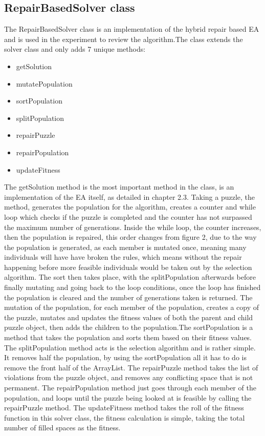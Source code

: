 \documentclass[a4paper,11pt]{article}
\begin{document}
\subsection{RepairBasedSolver class}

The RepairBasedSolver class is an implementation of the hybrid repair based EA and is used in the experiment to review the algorithm.\newline\newline The class extends the solver class and only adds 7 unique methods:
\begin{itemize}
	\item getSolution
	\item mutatePopulation
	\item sortPopulation
	\item splitPopulation
	\item repairPuzzle
	\item repairPopulation
	\item updateFitness
\end{itemize}
The getSolution method is the most important method in the class, is an implementation of the EA itself, as detailed in chapter 2.3. Taking a puzzle, the method, generates the population for the algorithm, creates a counter and while loop which checks if the puzzle is completed and the counter has not surpassed the maximum number of generations. Inside the while loop, the counter increases, then the population is repaired, this order changes from figure 2, due to the way the population is generated, as each member is mutated once, meaning many individuals will have have broken the rules, which means without the repair happening before more feasible individuals would be taken out by the selection algorithm. The sort then takes place, with the splitPopulation afterwards before finally mutating and going back to the loop conditions, once the loop has finished the population is cleared and the number of generations taken is returned. \newline\newline The mutation of the population, for each member of the population, creates a copy of the puzzle, mutates and updates the fitness values of both the parent and child puzzle object, then adds the children to the population.\newline\newline The sortPopulation is a method that takes the population and sorts them based on their fitness values. The splitPopulation method acts is the selection algorithm and is rather simple. It removes half the population, by using the sortPopulation all it has to do is remove the front half of the ArrayList. \newline\newline The repairPuzzle method takes the list of violations from the puzzle object, and removes any conflicting space that is not permanent. The repairPopulation method just goes through each member of the population, and loops until the puzzle being looked at is feasible by calling the repairPuzzle method. The updateFitness method takes the roll of the fitness function in this solver class, the fitness calculation is simple, taking the total number of filled spaces as the fitness.
\end{document}
